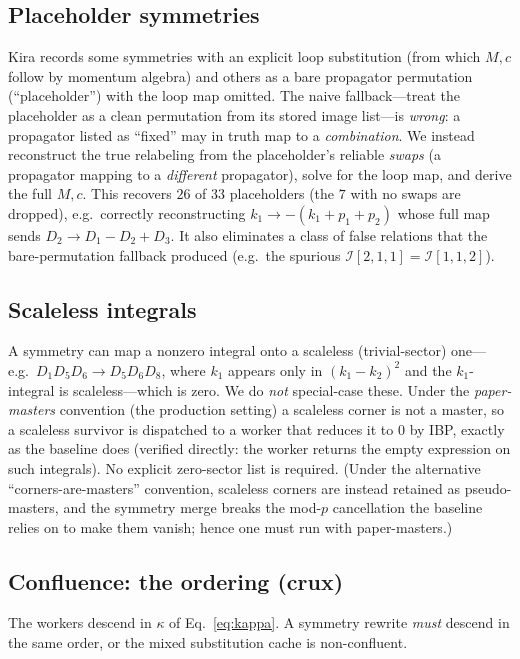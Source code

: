 \documentclass[11pt]{article}
\newcommand{\I}[1]{\mathcal{I}[#1]}
\newcommand{\kk}{\kappa}
\begin{document}
\subsection{Placeholder symmetries}
Kira records some symmetries with an explicit loop substitution (from which $M,c$
follow by momentum algebra) and others as a bare propagator permutation
(``placeholder'') with the loop map omitted. The naive fallback---treat the
placeholder as a clean permutation from its stored image list---is \emph{wrong}: a
propagator listed as ``fixed'' may in truth map to a \emph{combination}. We instead
reconstruct the true relabeling from the placeholder's reliable \emph{swaps} (a
propagator mapping to a \emph{different} propagator), solve for the loop map, and
derive the full $M,c$. This recovers $26$ of $33$ placeholders (the $7$ with no swaps
are dropped), e.g.\ correctly reconstructing $k_1\to-(k_1{+}p_1{+}p_2)$ whose full
map sends $D_2\to D_1-D_2+D_3$. It also eliminates a class of false relations that the
bare-permutation fallback produced (e.g.\ the spurious $\I{2,1,1}=\I{1,1,2}$).

\subsection{Scaleless integrals}
A symmetry can map a nonzero integral onto a scaleless (trivial-sector) one---e.g.\
$D_1D_5D_6\to D_5D_6D_8$, where $k_1$ appears only in $(k_1{-}k_2)^2$ and the
$k_1$-integral is scaleless---which is zero. We do \emph{not} special-case these. Under
the \emph{paper-masters} convention (the production setting) a scaleless corner is not
a master, so a scaleless survivor is dispatched to a worker that reduces it to $0$ by
IBP, exactly as the baseline does (verified directly: the worker returns the empty
expression on such integrals). No explicit zero-sector list is required. (Under the
alternative ``corners-are-masters'' convention, scaleless corners are instead retained
as pseudo-masters, and the symmetry merge breaks the mod-$p$ cancellation the baseline
relies on to make them vanish; hence one must run with paper-masters.)

\subsection{Confluence: the ordering (crux)}
\label{sec:confluence}
The workers descend in $\kk$ of Eq.~\eqref{eq:kappa}. A symmetry rewrite \emph{must}
descend in the same order, or the mixed substitution cache is non-confluent.
\end{document}
